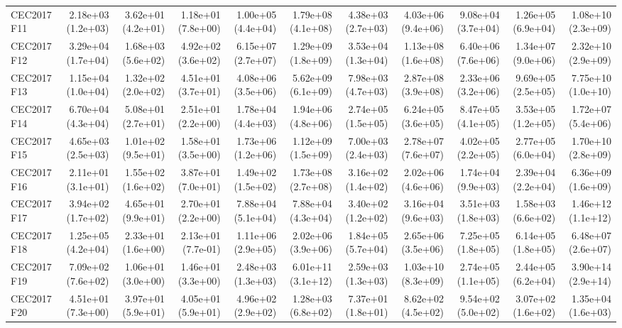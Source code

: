 \begin{longtable}{lrrrrrrrrrr}
CEC2017 F11 & 2.18e+03 (1.2e+03) & 3.62e+01 (4.2e+01) & 1.18e+01 (7.8e+00) & 1.00e+05 (4.4e+04) & 1.79e+08 (4.1e+08) & 4.38e+03 (2.7e+03) & 4.03e+06 (9.4e+06) & 9.08e+04 (3.7e+04) & 1.26e+05 (6.9e+04) & 1.08e+10 (2.3e+09) \\
CEC2017 F12 & 3.29e+04 (1.7e+04) & 1.68e+03 (5.6e+02) & 4.92e+02 (3.6e+02) & 6.15e+07 (2.7e+07) & 1.29e+09 (1.8e+09) & 3.53e+04 (1.3e+04) & 1.13e+08 (1.6e+08) & 6.40e+06 (7.6e+06) & 1.34e+07 (9.0e+06) & 2.32e+10 (2.9e+09) \\
CEC2017 F13 & 1.15e+04 (1.0e+04) & 1.32e+02 (2.0e+02) & 4.51e+01 (3.7e+01) & 4.08e+06 (3.5e+06) & 5.62e+09 (6.1e+09) & 7.98e+03 (4.7e+03) & 2.87e+08 (3.9e+08) & 2.33e+06 (3.2e+06) & 9.69e+05 (2.5e+05) & 7.75e+10 (1.0e+10) \\
CEC2017 F14 & 6.70e+04 (4.3e+04) & 5.08e+01 (2.7e+01) & 2.51e+01 (2.2e+00) & 1.78e+04 (4.4e+03) & 1.94e+06 (4.8e+06) & 2.74e+05 (1.5e+05) & 6.24e+05 (3.6e+05) & 8.47e+05 (4.1e+05) & 3.53e+05 (1.2e+05) & 1.72e+07 (5.4e+06) \\
CEC2017 F15 & 4.65e+03 (2.5e+03) & 1.01e+02 (9.5e+01) & 1.58e+01 (3.5e+00) & 1.73e+06 (1.2e+06) & 1.12e+09 (1.5e+09) & 7.00e+03 (2.4e+03) & 2.78e+07 (7.6e+07) & 4.02e+05 (2.2e+05) & 2.77e+05 (6.0e+04) & 1.70e+10 (2.8e+09) \\
CEC2017 F16 & 2.11e+01 (3.1e+01) & 1.55e+02 (1.6e+02) & 3.87e+01 (7.0e+01) & 1.49e+02 (1.5e+02) & 1.73e+08 (2.7e+08) & 3.16e+02 (1.4e+02) & 2.02e+06 (4.6e+06) & 1.74e+04 (9.9e+03) & 2.39e+04 (2.2e+04) & 6.36e+09 (1.6e+09) \\
CEC2017 F17 & 3.94e+02 (1.7e+02) & 4.65e+01 (9.9e+01) & 2.70e+01 (2.2e+00) & 7.88e+04 (5.1e+04) & 7.88e+04 (4.3e+04) & 3.40e+02 (1.2e+02) & 3.16e+04 (9.6e+03) & 3.51e+03 (1.8e+03) & 1.58e+03 (6.6e+02) & 1.46e+12 (1.1e+12) \\
CEC2017 F18 & 1.25e+05 (4.2e+04) & 2.33e+01 (1.6e+00) & 2.13e+01 (7.7e-01) & 1.11e+06 (2.9e+05) & 2.02e+06 (3.9e+06) & 1.84e+05 (5.7e+04) & 2.65e+06 (3.5e+06) & 7.25e+05 (1.8e+05) & 6.14e+05 (1.8e+05) & 6.48e+07 (2.6e+07) \\
CEC2017 F19 & 7.09e+02 (7.6e+02) & 1.06e+01 (3.0e+00) & 1.46e+01 (3.3e+00) & 2.48e+03 (1.3e+03) & 6.01e+11 (3.1e+12) & 2.59e+03 (1.3e+03) & 1.03e+10 (8.3e+09) & 2.74e+05 (1.1e+05) & 2.44e+05 (6.2e+04) & 3.90e+14 (2.9e+14) \\
CEC2017 F20 & 4.51e+01 (7.3e+00) & 3.97e+01 (5.9e+01) & 4.05e+01 (5.9e+01) & 4.96e+02 (2.9e+02) & 1.28e+03 (6.8e+02) & 7.37e+01 (1.8e+01) & 8.62e+02 (4.5e+02) & 9.54e+02 (5.0e+02) & 3.07e+02 (1.6e+02) & 1.35e+04 (1.6e+03) \\

\end{longtable}
